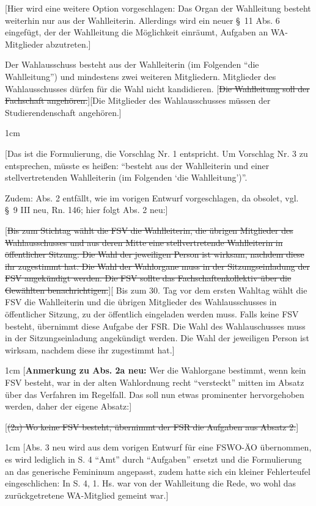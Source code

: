 \documentclass[%
draft,%
multilinesections%
]{fswo}
\newcommand\oldT[1]  {{\color{Gray}[\st{#1}]}}
\newcommand\newT[1]  {{\color{Green}[#1]}}
\newcommand\bemFr[1] {{\color{Red}[#1]}}
\newcommand\bemFe[1] {{\color{Cyan}[#1]}}
\newcommand\remark[1]{\begin{addmargin}{1cm}#1\end{addmargin}}
\newcommand\oldT[1]{}%
\newcommand\newT[1]{#1}
\newcommand\bemFr[1]{}%
\newcommand\bemFe[1]{}%
\newcommand\remark[1]{}
\newcommand\change[2]{\oldT{#1}\newT{#2}}
\begin{document}
\bemFe{Hier wird eine weitere Option vorgeschlagen: Das Organ der Wahlleitung besteht weiterhin nur aus der Wahlleiterin. Allerdings wird ein neuer \S~11 Abs. 6 eingefügt, der der Wahlleitung die Möglichkeit einräumt, Aufgaben an WA-Mitglieder abzutreten.}

\begin{contract}
Der Wahlausschuss besteht aus der Wahlleiterin (im Folgenden \enquote{die Wahlleitung}) und mindestens zwei weiteren Mitgliedern.
Mitglieder des Wahlausschusses dürfen für die Wahl nicht kandidieren.
\change{Die Wahlleitung soll der Fachschaft angehören.}{Die Mitglieder des Wahlausschusses müssen der Studierendenschaft angehören.}%
%
\remark{%
\bemFr{Das ist die Formulierung, die Vorschlag Nr. 1 entspricht.
Um Vorschlag Nr. 3 zu entsprechen, müsste es heißen: \enquote{besteht aus der Wahlleiterin und einer stellvertretenden Wahlleiterin (im Folgenden \enquote{die Wahlleitung})}.

Zudem: Abs. 2 entfällt, wie im vorigen Entwurf vorgeschlagen, da obsolet, vgl. \S~9 III neu, Rn. 146; hier folgt Abs. 2 neu:}
}

\change{Bis zum Stichtag wählt die FSV die Wahlleiterin, die übrigen Mitglieder des Wahlausschusses und aus deren Mitte eine stellvertretende Wahlleiterin in öffentlicher Sitzung.
Die Wahl der jeweiligen Person ist wirksam, nachdem diese ihr zugestimmt hat.
Die Wahl der Wahlorgane muss in der Sitzungseinladung der FSV angekündigt werden.
Die FSV sollte das Fachschaftenkollektiv über die Gewählten benachrichtigen.}{%
Bis zum 30. Tag vor dem ersten Wahltag wählt die FSV die Wahlleiterin und die übrigen Mitglieder des Wahlausschusses in öffentlicher Sitzung, zu der öffentlich eingeladen werden muss.
Falls keine FSV besteht, übernimmt diese Aufgabe der FSR.
Die Wahl des Wahlauschusses muss in der Sitzungseinladung angekündigt werden.
Die Wahl der jeweiligen Person ist wirksam, nachdem diese ihr zugestimmt hat.}
%
\remark{%
\bemFr{\textbf{Anmerkung zu Abs. 2a neu:} Wer die Wahlorgane bestimmt, wenn kein FSV besteht,
war in der alten Wahlordnung recht \enquote{versteckt} mitten im Absatz über das Verfahren im Regelfall.
Das soll nun etwas prominenter hervorgehoben werden, daher der eigene Absatz:}}
%
\oldT{(2a) Wo keine FSV besteht, übernimmt der FSR die Aufgaben aus Absatz 2.}


\remark{%
\bemFr{Abs. 3 neu wird aus dem vorigen Entwurf für eine FSWO-ÄO übernommen, es wird lediglich in S. 4 \enquote{Amt} durch \enquote{Aufgaben} ersetzt und die Formulierung an das generische Femininum angepasst,
zudem hatte sich ein kleiner Fehlerteufel eingeschlichen:
In S. 4, 1. Hs. war von der Wahlleitung die Rede, wo wohl das zurückgetretene WA-Mitglied gemeint war.}}


\end{contract}
\end{document}
